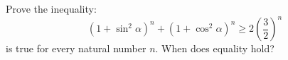 Prove the inequality:
$$(1+\sin^2\alpha)^n+(1+\cos^2\alpha)^n\ge2\left(\frac32\right)^n$$is true for every natural number $n$. When does equality hold?